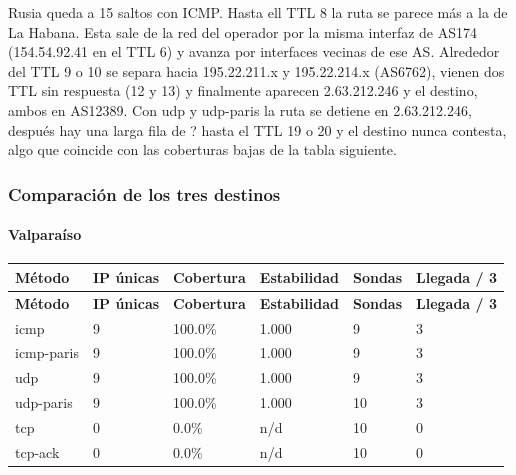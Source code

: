 Rusia queda a 15 saltos con ICMP. Hasta ell TTL 8 la ruta se parece más a la de La Habana. Esta sale de la red del operador por la misma interfaz de AS174 (154.54.92.41 en el TTL 6) y avanza por interfaces vecinas de ese AS. Alrededor del TTL 9 o 10 se separa hacia 195.22.211.x y 195.22.214.x (AS6762), vienen dos TTL sin respuesta (12 y 13) y finalmente aparecen 2.63.212.246 y el destino, ambos en AS12389. Con udp y udp-paris la ruta se detiene en 2.63.212.246, después hay una larga fila de ? hasta el TTL 19 o 20 y el destino nunca contesta, algo que coincide con las coberturas bajas de la tabla siguiente.


\subsubsection{Comparación de los tres destinos}
\paragraph{Valparaíso}
\begingroup
\fontsize{9}{11}\selectfont
\addtocounter{table}{-1}
\begin{longtable}{p{3.1cm}p{1.9cm}p{2.1cm}p{2.1cm}p{1.8cm}p{2.1cm}}
\toprule
\textbf{Método} & \textbf{IP únicas} & \textbf{Cobertura} & \textbf{Estabilidad} & \textbf{Sondas} & \textbf{Llegada / 3} \\ \midrule
\endfirsthead
\toprule
\textbf{Método} & \textbf{IP únicas} & \textbf{Cobertura} & \textbf{Estabilidad} & \textbf{Sondas} & \textbf{Llegada / 3} \\ \midrule
\endhead
icmp & 9 & 100.0\% & 1.000 & 9 & 3 \\
icmp-paris & 9 & 100.0\% & 1.000 & 9 & 3 \\
udp & 9 & 100.0\% & 1.000 & 9 & 3 \\
udp-paris & 9 & 100.0\% & 1.000 & 10 & 3 \\
tcp & 0 & 0.0\% & n/d & 10 & 0 \\
tcp-ack & 0 & 0.0\% & n/d & 10 & 0 \\
\bottomrule
\end{longtable}
\endgroup



